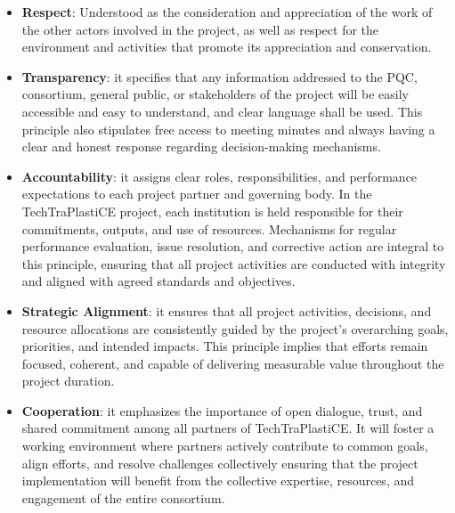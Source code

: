 \documentclass[
  12pt,
  oneside]{book}
\begin{document}
\begin{tcolorbox}[enhanced jigsaw, colframe=quarto-callout-note-color-frame, coltitle=black, rightrule=.15mm, bottomtitle=1mm, leftrule=.75mm, titlerule=0mm, opacitybacktitle=0.6, arc=.35mm, toprule=.15mm, bottomrule=.15mm, left=2mm, title=\textcolor{quarto-callout-note-color}{\faInfo}\hspace{0.5em}{Principles of TechTraPlastiCE Quality Committee}, colback=white, colbacktitle=quarto-callout-note-color!10!white, breakable, toptitle=1mm, opacityback=0]

\begin{itemize}
\item
  \textbf{Respect}: Understood as the consideration and appreciation of
  the work of the other actors involved in the project, as well as
  respect for the environment and activities that promote its
  appreciation and conservation.
\item
  \textbf{Transparency}: it specifies that any information addressed to
  the PQC, consortium, general public, or stakeholders of the project
  will be easily accessible and easy to understand, and clear language
  shall be used. This principle also stipulates free access to meeting
  minutes and always having a clear and honest response regarding
  decision-making mechanisms.
\item
  \textbf{Accountability}: it assigns clear roles, responsibilities, and
  performance expectations to each project partner and governing body.
  In the TechTraPlastiCE project, each institution is held responsible
  for their commitments, outputs, and use of resources. Mechanisms for
  regular performance evaluation, issue resolution, and corrective
  action are integral to this principle, ensuring that all project
  activities are conducted with integrity and aligned with agreed
  standards and objectives.
\item
  \textbf{Strategic Alignment}: it ensures that all project activities,
  decisions, and resource allocations are consistently guided by the
  project's overarching goals, priorities, and intended impacts. This
  principle implies that efforts remain focused, coherent, and capable
  of delivering measurable value throughout the project duration.
\item
  \textbf{Cooperation}: it emphasizes the importance of open dialogue,
  trust, and shared commitment among all partners of TechTraPlastiCE. It
  will foster a working environment where partners actively contribute
  to common goals, align efforts, and resolve challenges collectively
  ensuring that the project implementation will benefit from the
  collective expertise, resources, and engagement of the entire
  consortium.
\end{itemize}

\end{tcolorbox}
\end{document}

